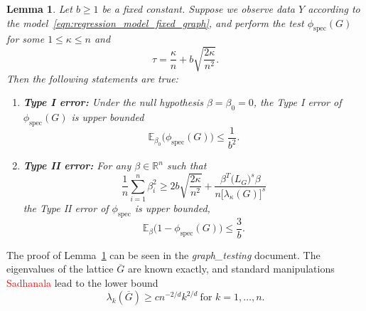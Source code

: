 \documentclass{article}
\newcommand{\Reals}{\mathbb{R}}
\newcommand{\1}{\mathbf{1}}
\newcommand{\ol}[1]{\overline{#1}}
\newcommand{\spec}{\mathrm{spec}}
\theoremstyle{alden}
\theoremstyle{aldenthm}
\newtheorem{lemma}{Lemma}
\theoremstyle{definition}
\theoremstyle{remark}
\begin{document}
\begin{lemma}
	\label{lem:fixed_graph_testing}
	Let $b \geq 1$ be a fixed constant. Suppose we observe data $Y$ according to the model~\eqref{eqn:regression_model_fixed_graph}, and perform the test $\phi_{\spec}(G)$ for some $1 \leq \kappa \leq n$ and
	\begin{equation*}
	\tau = \frac{\kappa}{n} + b\sqrt{\frac{2\kappa}{n^2}}.
	\end{equation*}
	Then the following statements are true:
	\begin{enumerate}
		\item \textbf{Type I error:} Under the null hypothesis $\beta = \beta_0 = 0$, the Type I error of $\phi_{\spec}(G)$ is upper bounded
		\begin{equation}
		\label{eqn:graph_spectral_type_I_error}
		\mathbb{E}_{\beta_0}\bigl(\phi_{\spec}(G)\bigr) \leq \frac{1}{b^2}.
		\end{equation}
		\item \textbf{Type II error:} For any $\beta \in \Reals^n$ such that
		\begin{equation}
		\label{eqn:fixed_graph_testing_critical_radius}
		\frac{1}{n} \sum_{i = 1}^{n} \beta_i^2 \geq 2b\sqrt{\frac{2\kappa}{n^2}} + \frac{\beta^T \bigl(L_G\bigr)^s \beta}{n\bigl[\lambda_{\kappa}(G)\bigr]^s}
		\end{equation}
		the Type II error of $\phi_{\spec}$ is upper bounded,
		\begin{equation}
		\label{eqn:graph_spectral_type_II_error}
		\mathbb{E}_{\beta}\bigl(1 - \phi_{\spec}(G)\bigr) \leq \frac{3}{b}.
		\end{equation}
	\end{enumerate}
\end{lemma}
The proof of Lemma~\ref{lem:fixed_graph_testing} can be seen in the \textit{graph\_testing} document. The eigenvalues of the lattice $\ol{G}$ are known exactly, and standard manipulations \textcolor{red}{Sadhanala} lead to the lower bound
\begin{equation}
\label{eqn:eigenvalue_tail_bound_grid}
\lambda_k(\ol{G}) \geq c n^{-2/d}k^{2/d}~\textrm{for $k = 1,\ldots,n$.}
\end{equation}
\end{document}
